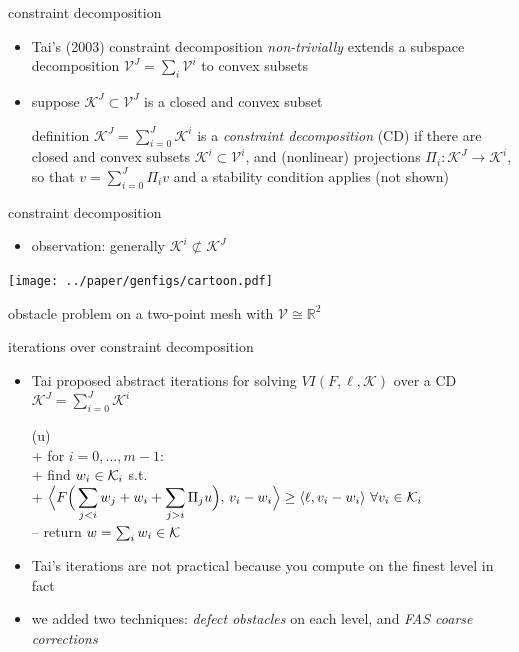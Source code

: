 \documentclass[svgnames,
               hyperref={colorlinks,citecolor=DeepPink4,linkcolor=FireBrick,urlcolor=Maroon},
               usepdftitle=false]  %
               {beamer}
\newcommand{\RR}{\mathbb{R}}
\newcommand{\ip}[2]{\left<#1,#2\right>}
\newcommand{\ds}{\displaystyle}
\begin{document}
\begin{frame}{constraint decomposition}

\begin{itemize}
\item Tai's (2003) constraint decomposition \emph{non-trivially} extends a subspace decomposition $\mathcal{V}^J = \sum_i\mathcal{V}^i$ to convex subsets
\item suppose $\mathcal{K}^J \subset \mathcal{V}^J$ is a closed and convex subset
\begin{block}{definition}
$\ds \mathcal{K}^J = \sum_{i=0}^J \mathcal{K}^i$ \quad is a \emph{constraint decomposition} (CD) if there are closed and convex subsets $\mathcal{K}^i\subset \mathcal{V}^i$, and (nonlinear) projections $\Pi_i : \mathcal{K}^J \to \mathcal{K}^i$, so that $\ds v = \sum_{i=0}^J \Pi_i v$ and a stability condition applies (not shown)
\end{block}
\end{itemize}
\end{frame}


\begin{frame}{constraint decomposition}

\begin{itemize}
\item observation: generally $\mathcal{K}^i \not\subset \mathcal{K}^J$
\end{itemize}

\bigskip
\begin{center}
\texttt{[image: ../paper/genfigs/cartoon.pdf]}

\medskip
{\small obstacle problem on a two-point mesh with $\mathcal{V} \cong \RR^2$}
\end{center}
\end{frame}


\begin{frame}{iterations over constraint decomposition}

\begin{itemize}
\item Tai proposed abstract iterations for solving $VI(F,\ell,\mathcal{K})$ over a CD $\mathcal{K}^J = \sum_{i=0}^J \mathcal{K}^i$

{\small
\begin{pseudo}[left-margin=-5mm]
(u)\text{:} \\+
    for $i = 0,\dots,m-1$: \\+
        find $w_i\in \mathcal{K}_i$ s.t. \\+
            $\displaystyle \Big<F\Big(\sum_{j<i} w_j + w_i + \sum_{j>i} \Pi_j u\Big),\, v_i - w_i\Big> \ge \ip{\ell}{v_i - w_i} \,\forall v_i \in \cK_i$ \\--
    return $w=\sum_i w_i\in\mathcal{K}$
\end{pseudo}
}

\medskip
\item Tai's iterations are not practical because you compute on the finest level in fact
\item we added two techniques: \emph{defect obstacles} on each level, and \emph{FAS coarse corrections}
\end{itemize}
\end{frame}
\end{document}
